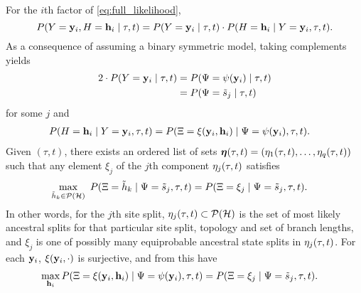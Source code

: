 For the $i$th factor of \eqref{eq:full_likelihood},
$$
P(Y=\mathbf{y}_i, H=\mathbf{h}_i \mid \tau, t) = P(Y=\mathbf{y}_i \mid \tau, t) \cdot P(H=\mathbf{h}_i \mid Y=\mathbf{y}_i, \tau, t).
$$
As a consequence of assuming a binary symmetric model, taking complements yields
\begin{align*}
    2\cdot P(Y=\mathbf{y}_i \mid \tau, t) &= P(\Psi=\psi(\mathbf{y}_i) \mid \tau, t) \\
                                                                 &= P(\Psi=\tilde{s}_j \mid \tau, t)
\end{align*}
for some $j$ and
\begin{align*}
    P(H=\mathbf{h}_i \mid Y=\mathbf{y}_i, \tau, t) &= P(\Xi=\xi(\mathbf{y}_i, \mathbf{h}_i) \mid \Psi=\psi(\mathbf{y}_i), \tau, t).
\end{align*}
Given $(\tau, t)$, there exists an ordered list of sets $\boldsymbol\eta(\tau, t)=(\eta_1(\tau, t),\ldots,\eta_q(\tau, t))$ such that any element $\xi_j$ of the $j$th component $\eta_j(\tau, t)$ satisfies
\begin{align*}
\max_{\ancestralSplit_k\in\mathcal{P}(\ancestralSplitSet)} \ P(\ancestralSplitRV=\ancestralSplit_k \mid \siteSplitRV=\siteSplit_j, \tau, t) &= P(\ancestralSplitRV = \xi_j \mid \siteSplitRV=\siteSplit_j, \tau, t).
\end{align*}
In other words, for the $j$th site split, $\eta_j(\tau, t)\subset\mathcal{P}(\mathcal{H})$ is the set of most likely ancestral splits for that particular site split, topology and set of branch lengths, and $\xi_j$ is one of possibly many equiprobable ancestral state splits in $\eta_j(\tau, t)$.
For each $\mathbf{y}_i$, $\xi(\mathbf{y}_i, \cdot)$ is surjective, and from this have
\begin{align*}
\max_{\mathbf{h}_i} P(\Xi=\xi(\mathbf{y}_i, \mathbf{h}_i) \mid \Psi=\psi(\mathbf{y}_i), \tau, t) &= P(\Xi = \xi_j \mid \Psi=\tilde{s}_j, \tau, t).
\end{align*}

